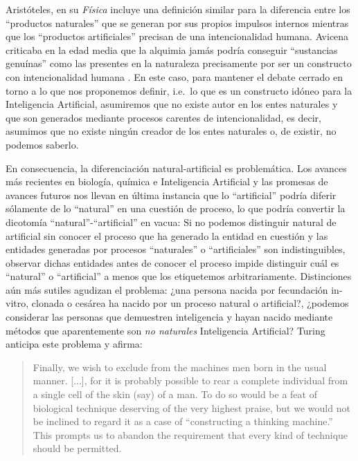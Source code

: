 \documentclass[12pt]{memoir}
\begin{document}
Aristóteles, en su \textit{Física} incluye una definición similar para la diferencia entre los ``productos naturales'' que se generan por sus propios impulsos internos mientras que los ``productos artificiales'' precisan de una intencionalidad humana. Avicena criticaba en la edad media que la alquimia jamás podría conseguir ``sustancias genuínas'' como las presentes en la naturaleza precisamente por ser un constructo con intencionalidad humana \parencite[apartado 1.1]{sep-technology}. En este caso, para mantener el debate cerrado en torno a lo que nos proponemos definir, i.e.\ lo que es un constructo idóneo para la Inteligencia Artificial, asumiremos que no existe autor en los entes naturales y que son generados mediante procesos carentes de intencionalidad, es decir, asumimos que no existe ningún creador de los entes naturales o, de existir, no podemos saberlo.

En consecuencia, la diferenciación natural-artificial es problemática. Los avances más recientes en biología, química e Inteligencia Artificial y las promesas de avances futuros nos llevan en última instancia que lo ``artificial'' podría diferir sólamente de lo ``natural'' en una cuestión de proceso, lo que podría convertir la dicotomía ``natural''-``artificial'' en vacua: Si no podemos distinguir natural de artificial sin conocer el proceso que ha generado la entidad en cuestión y las entidades generadas por procesos ``naturales'' o ``artificiales'' son indistinguibles, observar dichas entidades antes de conocer el proceso impide distinguir cuál es ``natural'' o ``artificial'' a menos que los etiquetemos arbitrariamente. Distinciones aún más sutiles agudizan el problema: ¿una persona nacida por fecundación in-vitro, clonada o cesárea ha nacido por un proceso natural o artificial?, ¿podemos considerar las personas que demuestren inteligencia y hayan nacido mediante métodos que aparentemente son \textit{no naturales} Inteligencia Artificial? Turing anticipa este problema y afirma:

\begin{quotation}
Finally, we wish to exclude from the machines men born in the usual manner. [...], for it is probably possible to rear a complete individual from a single cell of the skin (say) of a man. To do so would be a feat of biological technique deserving of the very highest praise, but we would not be inclined to regard it as a case of ``constructing a thinking machine.'' This prompts us to abandon the requirement that every kind of technique should be permitted. \parencite[apartado 3]{Turing1950cmi}
\end{quotation}
\end{document}
